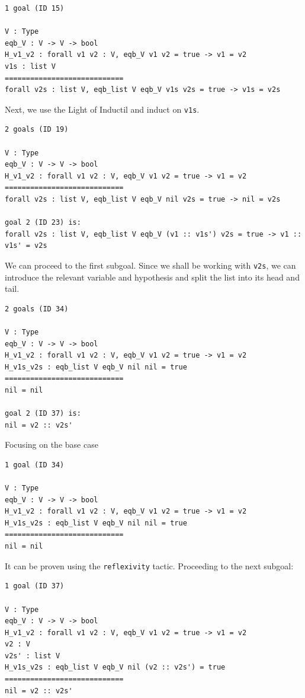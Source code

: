 \documentclass{article}
\begin{document}
\begin{lstlisting}
1 goal (ID 15)

V : Type
eqb_V : V -> V -> bool
H_v1_v2 : forall v1 v2 : V, eqb_V v1 v2 = true -> v1 = v2
v1s : list V
============================
forall v2s : list V, eqb_list V eqb_V v1s v2s = true -> v1s = v2s
\end{lstlisting}

Next, we use the Light of Inductil and induct on \texttt{v1s}.

\begin{lstlisting}
2 goals (ID 19)

V : Type
eqb_V : V -> V -> bool
H_v1_v2 : forall v1 v2 : V, eqb_V v1 v2 = true -> v1 = v2
============================
forall v2s : list V, eqb_list V eqb_V nil v2s = true -> nil = v2s

goal 2 (ID 23) is:
forall v2s : list V, eqb_list V eqb_V (v1 :: v1s') v2s = true -> v1 :: v1s' = v2s
\end{lstlisting}

We can proceed to the first subgoal. Since we shall be working with \texttt{v2s}, we can introduce the relevant variable and hypothesis and split the list into its head and tail.

\begin{lstlisting}
2 goals (ID 34)

V : Type
eqb_V : V -> V -> bool
H_v1_v2 : forall v1 v2 : V, eqb_V v1 v2 = true -> v1 = v2
H_v1s_v2s : eqb_list V eqb_V nil nil = true
============================
nil = nil

goal 2 (ID 37) is:
nil = v2 :: v2s'
\end{lstlisting}

Focusing on the base case

\begin{lstlisting}
1 goal (ID 34)

V : Type
eqb_V : V -> V -> bool
H_v1_v2 : forall v1 v2 : V, eqb_V v1 v2 = true -> v1 = v2
H_v1s_v2s : eqb_list V eqb_V nil nil = true
============================
nil = nil
\end{lstlisting}

It can be proven using the \texttt{reflexivity} tactic. Proceeding to the next subgoal:

\begin{lstlisting}
1 goal (ID 37)

V : Type
eqb_V : V -> V -> bool
H_v1_v2 : forall v1 v2 : V, eqb_V v1 v2 = true -> v1 = v2
v2 : V
v2s' : list V
H_v1s_v2s : eqb_list V eqb_V nil (v2 :: v2s') = true
============================
nil = v2 :: v2s'
\end{lstlisting}
\end{document}
